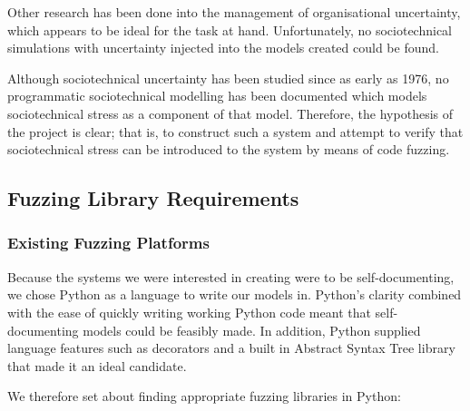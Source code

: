 \documentclass[11pt, twocolumn]{article}
\begin{document}
Other research has been done into the management of organisational uncertainty\cite{Grote2004}\cite{Herrmann1999}, which appears to be ideal for the task at hand. Unfortunately, no sociotechnical simulations with uncertainty injected into the models created could be found. \par

Although sociotechnical uncertainty has been studied since as early as 1976\cite{Susman1976}, no programmatic sociotechnical modelling has been documented which models sociotechnical stress as a component of that model. Therefore, the hypothesis of the project is clear; that is, to construct such a system and attempt to verify that sociotechnical stress can be introduced to the system by means of code fuzzing. \par

\subsection{Fuzzing Library Requirements}\label{planning_fuzzing}


\subsubsection{Existing Fuzzing Platforms}
\label{research_fuzzing}
Because the systems we were interested in creating were to be self-documenting, we chose Python as a language to write our models in. Python's clarity combined with the ease of quickly writing working Python code meant that self-documenting models could be feasibly made. In addition, Python supplied language features such as decorators and a built in Abstract Syntax Tree library that made it an ideal candidate. \par
We therefore set about finding appropriate fuzzing libraries in Python:
\end{document}
